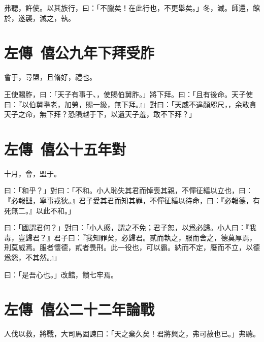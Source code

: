 弗聽，許使。以其族行，曰：「不臘矣！在此行也，不更舉矣。」冬，滅。師還，館於，遂襲，滅之，執。
\nopagebreak
\theendnotes

\section[齊桓下拜受胙\quad{\small 左傳\ 僖公九年}]{{\normalsize 左傳\ 僖公九年}\quad {}下拜受胙}
會于，尋盟，且脩好，禮也。

王使賜胙，曰：「天子有事于、，使賜伯舅胙。」將下拜。曰：「且有後命。天子使曰：『以伯舅耋老，加勞，賜一級，無下拜。』」對曰：「天威不違顏咫尺，，余敢貪天子之命，無下拜？恐隕越于下，以遺天子羞，敢不下拜？」

\section[陰飴甥對秦伯\quad{\small 左傳\ 僖公十五年}]{{\normalsize 左傳\ 僖公十五年}\quad {}對}
十月，會，盟于。

曰：「和乎？」對曰：「不和。小人恥失其君而悼喪其親，不憚征繕以立也，曰：『必報讎，寧事戎狄。』君子愛其君而知其罪，不憚征繕以待命，曰：『必報德，有死無二。』以此不和。」

曰：「國謂君何？」對曰：「小人慼，謂之不免；君子恕，以爲必歸。小人曰：『我毒，豈歸君？』君子曰：『我知罪矣，必歸君。貳而執之，服而舍之，德莫厚焉，刑莫威焉。服者懷德，貳者畏刑。此一役也，可以霸。納而不定，廢而不立，以德爲怨，不其然。』」

曰：「是吾心也。」改館，饋七牢焉。

\section[子魚論戰\quad{\small 左傳\ 僖公二十二年}]{{\normalsize 左傳\ 僖公二十二年}\quad {}論戰}
人伐以救，將戰，大司馬固諫曰：「天之棄久矣！君將興之，弗可赦也已。」弗聽。


